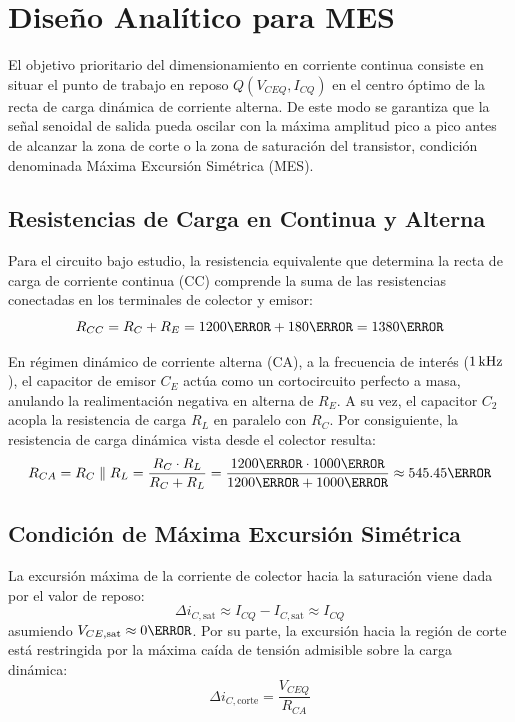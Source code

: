 \chapter{Diseño Analítico para MES}
\label{chap:diseno_teorico}

El objetivo prioritario del dimensionamiento en corriente continua consiste en situar el punto de trabajo en
reposo $Q(V_{CEQ}, I_{CQ})$ en el centro óptimo de la recta de carga dinámica de corriente alterna. De este modo se
garantiza que la señal senoidal de salida pueda oscilar con la máxima amplitud pico a pico antes de alcanzar la zona
de corte o la zona de saturación del transistor, condición denominada Máxima Excursión Simétrica (MES).

\section{Resistencias de Carga en Continua y Alterna}

Para el circuito bajo estudio, la resistencia equivalente que determina la recta de carga de corriente continua (CC)
comprende la suma de las resistencias conectadas en los terminales de colector y emisor:
\begin{equation}
  R_{CC} = R_C + R_E = 1200\ohm + 180\ohm = 1380\ohm
  \label{eq:Rcc}
\end{equation}

En régimen dinámico de corriente alterna (CA), a la frecuencia de interés ($1\,\mathrm{kHz}$), el capacitor de emisor $C_E$ actúa
como un cortocircuito perfecto a masa, anulando la realimentación negativa en alterna de $R_E$. A su vez, el capacitor
$C_2$ acopla la resistencia de carga $R_L$ en paralelo con $R_C$. Por consiguiente, la resistencia de carga dinámica
vista desde el colector resulta:
\begin{equation}
  R_{CA} = R_C \parallel R_L = \frac{R_C \cdot R_L}{R_C + R_L} = \frac{1200\ohm \cdot 1000\ohm}{1200\ohm + 1000\ohm} \approx 545.45\ohm
  \label{eq:Rca}
\end{equation}

\section{Condición de Máxima Excursión Simétrica}

La excursión máxima de la corriente de colector hacia la saturación viene dada por el valor de reposo:
\begin{equation}
  \Delta i_{C,\text{sat}} \approx I_{CQ} - I_{C,\text{sat}} \approx I_{CQ}
\end{equation}
asumiendo $V_{CE,\text{sat}} \approx 0\V$. Por su parte, la excursión hacia la región de corte está restringida por la
máxima caída de tensión admisible sobre la carga dinámica:
\begin{equation}
  \Delta i_{C,\text{corte}} = \frac{V_{CEQ}}{R_{CA}}
\end{equation}

